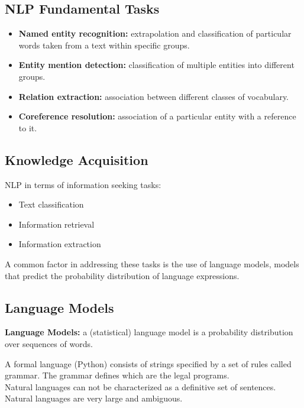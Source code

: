 \subsection{NLP Fundamental Tasks}
\begin{itemize}
    \item \textbf{Named entity recognition:} extrapolation and classification of particular words taken from a text within specific groups.
    \item \textbf{Entity mention detection:} classification of multiple entities into different groups.
    \item \textbf{Relation extraction:} association between different classes of vocabulary.
    \item \textbf{Coreference resolution:} association of a particular entity with a reference to it.
\end{itemize}

\subsection{Knowledge Acquisition}
NLP in terms of information seeking tasks:
\begin{itemize}
    \item Text classification
    \item Information retrieval
    \item Information extraction
\end{itemize}
A common factor in addressing these tasks is the use of language models, models that predict the probability distribution of language expressions.

\subsection{Language Models}
\begin{mdframed}
    \textbf{Language Models:} a (statistical) language model is a probability distribution over sequences of words.
\end{mdframed}
A formal language (Python) consists of strings specified by a set of rules called grammar.
The grammar defines which are the legal programs. \\
\vspace{1em}
Natural languages can not be characterized as a definitive set of sentences.
Natural languages are very large and ambiguous.

